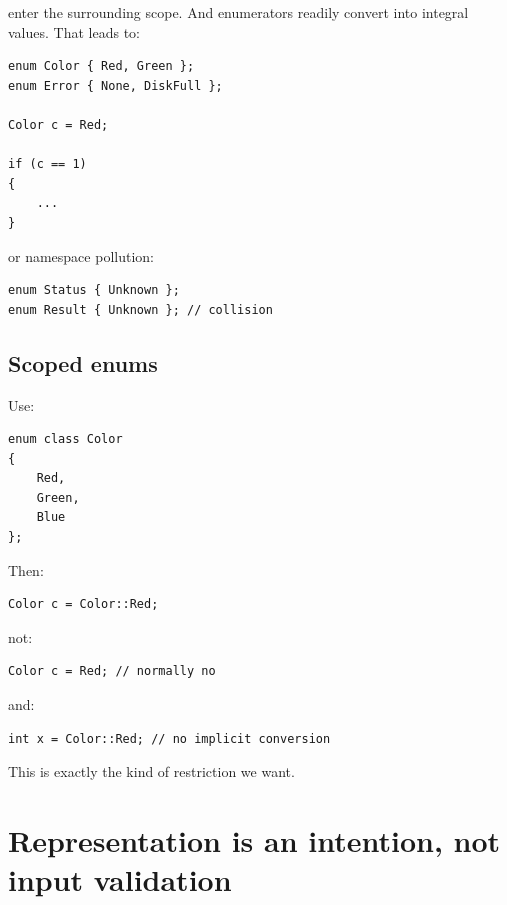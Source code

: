 enter the surrounding scope. And enumerators readily convert into integral values. That leads to:

\begin{verbatim}
enum Color { Red, Green };
enum Error { None, DiskFull };

Color c = Red;

if (c == 1)
{
    ...
}
\end{verbatim}

or namespace pollution:

\begin{verbatim}
enum Status { Unknown };
enum Result { Unknown }; // collision
\end{verbatim}

\subsection{Scoped enums}\label{01-foundations-i-ch002-scoped-enums}

\hypertarget{01-foundations-i-ch002-scoped-enums}{}

Use:

\begin{verbatim}
enum class Color
{
    Red,
    Green,
    Blue
};
\end{verbatim}

Then:

\begin{verbatim}
Color c = Color::Red;
\end{verbatim}

not:

\begin{verbatim}
Color c = Red; // normally no
\end{verbatim}

and:

\begin{verbatim}
int x = Color::Red; // no implicit conversion
\end{verbatim}

This is exactly the kind of restriction we want.

\section{Representation is an intention, not input validation}\label{01-foundations-i-ch002-representation-is-an-intention-not-input-validation}

\hypertarget{01-foundations-i-ch002-representation-is-an-intention-not-input-validation}{}

